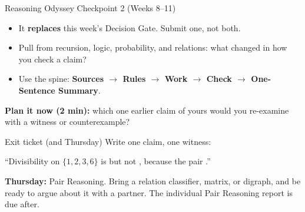 \documentclass[aspectratio=169,10pt]{beamer}
\begin{document}
\begin{frame}{Reasoning Odyssey Checkpoint 2 (Weeks 8--11)}
\begin{itemize}
\item It \textbf{replaces} this week's Decision Gate. Submit one, not both.
\item Pull from recursion, logic, probability, and relations: what changed in how you check a claim?
\item Use the spine: \textbf{Sources $\to$ Rules $\to$ Work $\to$ Check $\to$ One-Sentence Summary}.
\end{itemize}
\textbf{Plan it now (2 min):} which one earlier claim of yours would you re-examine with a witness or counterexample?
\end{frame}

\begin{frame}{Exit ticket (and Thursday)}
Write one claim, one witness:
\begin{block}{}
``Divisibility on $\{1,2,3,6\}$ is \underline{\hspace{2cm}} but not \underline{\hspace{2cm}}, because the pair \underline{\hspace{2cm}} \underline{\hspace{2cm}}.''
\end{block}
\vspace{4pt}
\textbf{Thursday:} Pair Reasoning. Bring a relation classifier, matrix, or digraph, and be ready to argue about it with a partner. The individual Pair Reasoning report is due after.
\end{frame}
\end{document}
